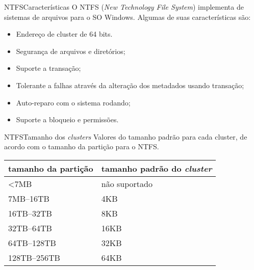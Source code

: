 
\begin{frame}{NTFS}{Características}
  O NTFS ({\em New Technology File System}) implementa de sistemas de
  arquivos para o SO Windows\textsuperscript{\textregistered}. Algumas
  de suas características são:

  \begin{itemize}
  \item<1> Endereço de cluster de 64 bits.
  \item<2> Segurança de arquivos e diretórios;
  \item<3> Suporte a transação;
  \item<4> Tolerante a falhas através da alteração dos metadados 
    usando transação;
  \item<5> Auto-reparo com o sistema rodando;
  \item<6> Suporte a bloqueio e permissões.
  \end{itemize}  
\end{frame}

\begin{frame}{NTFS}{Tamanho dos {\em clusters}}
  Valores do tamanho padrão para cada cluster, de acordo com o tamanho
  da partição para o NTFS.
  \begin{center}
    \begin{tabular}[ht]{|l|l|}\hline
      \bf tamanho da partição & \bf tamanho padrão do {\em cluster} \\\hline
      <7MB & não suportado\\\hline
      7MB--16TB & 4KB\\\hline
      16TB--32TB & 8KB\\\hline
      32TB--64TB & 16KB\\\hline
      64TB--128TB & 32KB\\\hline
      128TB--256TB & 64KB\\\hline
    \end{tabular}
  \end{center}
\end{frame}

